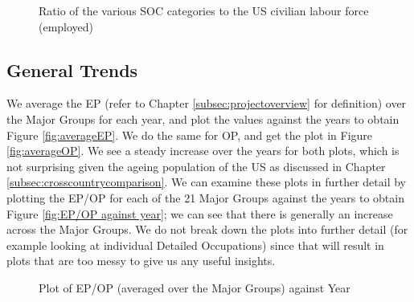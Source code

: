 \documentclass[11pt]{article}
\begin{document}
\begin{figure}[!htb]
	\centering
	\hfill
	\hfill
	\hfill
	\hfill
	\caption{Ratio of the various SOC categories to the US civilian labour force (employed)}
	\label{proportionemp}
\end{figure}
    
\subsection{General Trends}
\label{subsec:generaltrends}
We average the EP (refer to Chapter \ref{subsec:projectoverview} for definition) over the Major Groups for each year, and plot the values against the years to obtain Figure \ref{fig:averageEP}. We do the same for OP, and get the plot in Figure \ref{fig:averageOP}. We see a steady increase over the years for both plots, which is not surprising given the ageing population of the US as discussed in Chapter \ref{subsec:crosscountrycomparison}. We can examine these plots in further detail by plotting the EP/OP for each of the 21 Major Groups against the years to obtain Figure \ref{fig:EP/OP against year}; we can see that there is generally an increase across the Major Groups. We do not break down the plots into further detail (for example looking at individual Detailed Occupations) since that will result in plots that are too messy to give us any useful insights.



\begin{figure}[!htb]
	\centering
	\hfill
	\hfill
	\caption{Plot of EP/OP (averaged over the Major Groups) against Year}
\end{figure}
\end{document}
